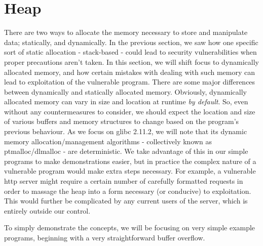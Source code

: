 \section{Heap}
There are two ways to allocate the memory necessary to store and manipulate data;
statically, and dynamically. In the previous section, we saw how one
specific sort of static allocation - stack-based - could lead to
security vulnerabilities when proper precautions aren't taken. In this section,
we will shift focus to dynamically allocated memory, and how
certain mistakes with dealing with such memory can lead to exploitation
of the vulnerable program. There are some major differences between
dynamically and statically allocated memory. Obviously, dynamically
allocated memory can vary in size and location at runtime \emph{by default}.
So, even without any countermeasures to consider, we should expect
the location and size of various buffers and memory structures to change
based on the program's previous behaviour. As we focus on glibc 2.11.2,
we will note that its dynamic memory allocation/management algorithms - 
collectively known as ptmalloc/dlmalloc - are deterministic. We take
advantage of this in our simple programs to make demonstrations easier,
but in practice the complex nature of a vulnerable program would make
extra steps necessary. For example, a vulnerable http server might
require a certain number of carefully formatted requests in order
to massage the heap into a form necessary (or conducive) to exploitation.
This would further be complicated by any current users of the server,
which is entirely outside our control.

To simply demonstrate the concepts, we will be focusing on very simple
example programs, beginning with a very straightforward buffer overflow.





